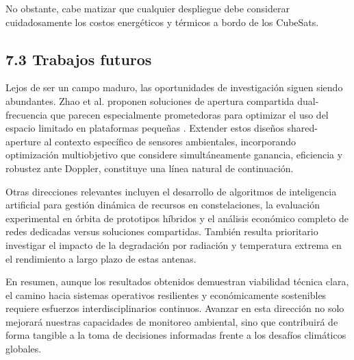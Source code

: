 No obstante, cabe matizar que cualquier despliegue debe considerar cuidadosamente los costos energéticos y térmicos a bordo de los CubeSats.

\subsection{7.3 Trabajos futuros}

Lejos de ser un campo maduro, las oportunidades de investigación siguen siendo abundantes. Zhao et al. proponen soluciones de apertura compartida dual-frecuencia que parecen especialmente prometedoras para optimizar el uso del espacio limitado en plataformas pequeñas \cite{Zhao2024}. Extender estos diseños shared-aperture al contexto específico de sensores ambientales, incorporando optimización multiobjetivo que considere simultáneamente ganancia, eficiencia y robustez ante Doppler, constituye una línea natural de continuación.

Otras direcciones relevantes incluyen el desarrollo de algoritmos de inteligencia artificial para gestión dinámica de recursos en constelaciones, la evaluación experimental en órbita de prototipos híbridos y el análisis económico completo de redes dedicadas versus soluciones compartidas. También resulta prioritario investigar el impacto de la degradación por radiación y temperatura extrema en el rendimiento a largo plazo de estas antenas.

En resumen, aunque los resultados obtenidos demuestran viabilidad técnica clara, el camino hacia sistemas operativos resilientes y económicamente sostenibles requiere esfuerzos interdisciplinarios continuos. Avanzar en esta dirección no solo mejorará nuestras capacidades de monitoreo ambiental, sino que contribuirá de forma tangible a la toma de decisiones informadas frente a los desafíos climáticos globales.